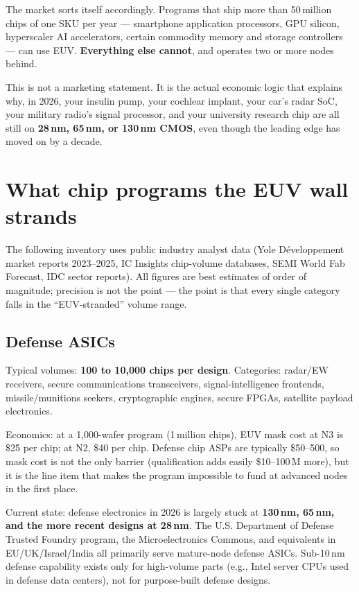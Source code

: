 \documentclass[11pt,letterpaper]{article}
\begin{document}
The market sorts itself accordingly. Programs that ship more than 50\,million chips of one SKU per year --- smartphone application processors, GPU silicon, hyperscaler AI accelerators, certain commodity memory and storage controllers --- can use EUV. \textbf{Everything else cannot}, and operates two or more nodes behind.

This is not a marketing statement. It is the actual economic logic that explains why, in 2026, your insulin pump, your cochlear implant, your car's radar SoC, your military radio's signal processor, and your university research chip are all still on \textbf{28\,nm, 65\,nm, or 130\,nm CMOS}, even though the leading edge has moved on by a decade.

\section{What chip programs the EUV wall strands}

The following inventory uses public industry analyst data (Yole D\'eveloppement market reports 2023--2025, IC Insights chip-volume databases, SEMI World Fab Forecast, IDC sector reports). All figures are best estimates of order of magnitude; precision is not the point --- the point is that every single category falls in the ``EUV-stranded'' volume range.

\subsection{Defense ASICs}

Typical volumes: \textbf{100 to 10{,}000 chips per design}. Categories: radar/EW receivers, secure communications transceivers, signal-intelligence frontends, missile/munitions seekers, cryptographic engines, secure FPGAs, satellite payload electronics.

Economics: at a 1{,}000-wafer program (1\,million chips), EUV mask cost at N3 is \$25 per chip; at N2, \$40 per chip. Defense chip ASPs are typically \$50--500, so mask cost is not the only barrier (qualification adds easily \$10--100\,M more), but it is the line item that makes the program impossible to fund at advanced nodes in the first place.

Current state: defense electronics in 2026 is largely stuck at \textbf{130\,nm, 65\,nm, and the more recent designs at 28\,nm}. The U.S. Department of Defense Trusted Foundry program, the Microelectronics Commons, and equivalents in EU/UK/Israel/India all primarily serve mature-node defense ASICs. Sub-10\,nm defense capability exists only for high-volume parts (e.g., Intel server CPUs used in defense data centers), not for purpose-built defense designs.
\end{document}
